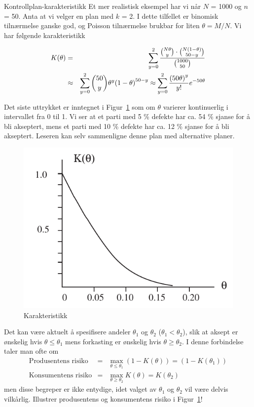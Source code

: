 \begin{eksempel}{Kontrollplan-karakteristikk}
Et mer realistisk eksempel har vi når $N$ = 1000 og $n$ = 50.  Anta 
at vi velger en plan med $k$ = 2.  I dette tilfellet er binomisk 
tilnærmelse ganske god, og Poisson tilnærmelse brukbar for liten
$\theta = M/N$.  Vi har følgende karakteristikk


\begin{eqnarray*}
K(\theta )&=&\sum_{y=0}^2 \frac{{{N\theta }\choose{y}} \cdot 
         {{N(1-\theta )}\choose{50-y}}}{{{1000}\choose{50}}}
 \\
     &\approx&\sum_{y=0}^2 {{50}\choose{y}}{\theta}^y{(1-\theta )}^{50-y} 
     \approx  \sum_{y=0}^2 \frac{{(50\theta )}^y}{y!}e^{-50\theta}
\end{eqnarray*}

\noindent Det siste uttrykket er inntegnet i Figur~\ref{fig:karakteristikk} som om $\theta $ varierer
kontinuerlig i intervallet fra 0 til 1.  Vi ser at et parti med 5 \%
defekte har ca. 54 \% sjanse for å bli akseptert, mens et parti med
10 \% defekte har ca. 12 \% sjanse for å bli akseptert.  Leseren 
kan selv sammenligne denne plan med alternative planer.
\end{eksempel}

\begin{figure}[ht]
\centering
	\includegraphics[scale=1.0]{figurer/fig15_1.pdf} 
\caption{Karakteristikk}
	\label{fig:karakteristikk}
\end{figure}

Det kan være aktuelt å spesifisere andeler
 ${\theta}_1$ og ${\theta}_2$ (${\theta}_1<{\theta}_2$), slik at aksept er
ønskelig hvis $\theta \leq {\theta}_1$ mens forkasting er
ønskelig hvis $\theta \geq {\theta}_2$.  I denne forbindelse taler
man ofte om 
\begin{eqnarray*}
\mbox{Produsentens risiko}&=&\max_{\theta \leq \theta_1}(1-K(\theta ))
                                                   = (1-K(\theta_1)) \\
\mbox{Konsumentens risiko}&=&\max_{\theta \geq \theta_2}K(\theta ) = K(\theta_2) 
\end{eqnarray*}
\noindent men disse begreper er ikke entydige, idet valget av ${\theta}_1$ og
${\theta}_2$ vil være delvis vilkårlig.  Illustrer produsentens
og konsumentens risiko i Figur~\ref{fig:karakteristikk}!

